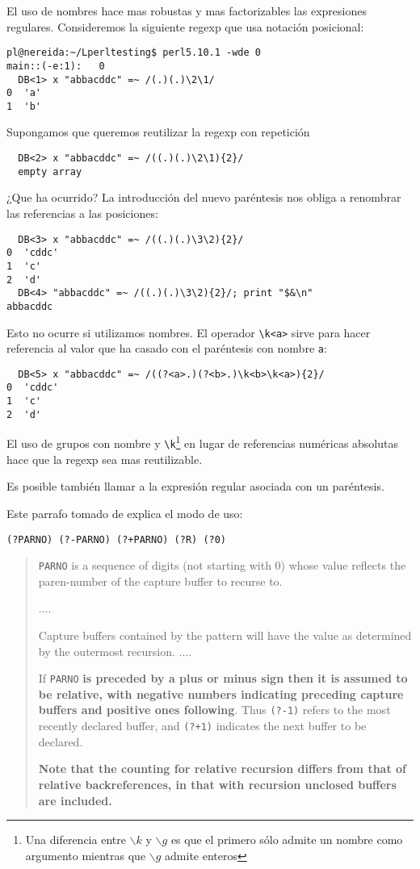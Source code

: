 El uso de nombres hace mas robustas y mas factorizables
las expresiones regulares.
Consideremos la siguiente regexp que usa notación posicional:
\begin{verbatim}
pl@nereida:~/Lperltesting$ perl5.10.1 -wde 0
main::(-e:1):   0
  DB<1> x "abbacddc" =~ /(.)(.)\2\1/
0  'a'
1  'b'
\end{verbatim}
Supongamos que queremos reutilizar la regexp con repetición
\begin{verbatim}
  DB<2> x "abbacddc" =~ /((.)(.)\2\1){2}/
  empty array
\end{verbatim}
¿Que ha ocurrido? La introducción del nuevo paréntesis 
nos obliga a renombrar las referencias a las posiciones:
\begin{verbatim}
  DB<3> x "abbacddc" =~ /((.)(.)\3\2){2}/
0  'cddc'
1  'c'
2  'd'
  DB<4> "abbacddc" =~ /((.)(.)\3\2){2}/; print "$&\n"
abbacddc
\end{verbatim}
Esto no ocurre si utilizamos nombres. 
El operador \verb|\k<a>| sirve para hacer referencia
al valor que ha casado con el paréntesis con nombre \verb|a|:
\begin{verbatim}
  DB<5> x "abbacddc" =~ /((?<a>.)(?<b>.)\k<b>\k<a>){2}/
0  'cddc'
1  'c'
2  'd'
\end{verbatim}
El uso de grupos con nombre y 
\verb|\k|\footnote{
Una diferencia entre {\tt $\backslash k$} y {\tt $\backslash g$} es que el primero 
sólo admite un nombre como argumento  mientras que {\tt $\backslash g$}
admite enteros}
en lugar de referencias numéricas absolutas
hace que la regexp sea mas reutilizable.


Es posible también llamar a la expresión regular
asociada con un paréntesis.

Este parrafo tomado de
explica el modo de uso:

\begin{it}
\verb|(?PARNO) (?-PARNO) (?+PARNO) (?R) (?0)|
\begin{quotation}

\verb|PARNO| is a sequence of digits (not starting with 0) whose value reflects
the paren-number of the capture buffer to recurse to. 

....

Capture buffers contained by the pattern will have the value as determined by the outermost recursion.
....

If \verb|PARNO| {\bf is preceded by a plus or minus sign then it is assumed to
be relative, with negative numbers indicating preceding capture buffers
and positive ones following}. Thus \verb|(?-1)| refers to the most recently
declared buffer, and \verb|(?+1)| indicates the next buffer to be declared. 

{\bf Note
that the counting for relative recursion differs from that of relative
backreferences, in that with recursion unclosed buffers are included.}
\end{quotation}
\end{it}

